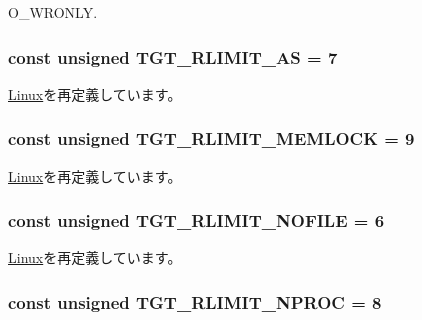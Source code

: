 O\_\-WRONLY. \hypertarget{classAlphaLinux_a6e372e5f43e2da816e9bbf5088d89c21}{
\subsubsection[{TGT\_\-RLIMIT\_\-AS}]{\setlength{\rightskip}{0pt plus 5cm}const unsigned {\bf TGT\_\-RLIMIT\_\-AS} = 7}}
\label{classAlphaLinux_a6e372e5f43e2da816e9bbf5088d89c21}


\hyperlink{classLinux_a6e372e5f43e2da816e9bbf5088d89c21}{Linux}を再定義しています。\hypertarget{classAlphaLinux_acfa2b204cbb5bca2fbc2c1f15649aca2}{
\subsubsection[{TGT\_\-RLIMIT\_\-MEMLOCK}]{\setlength{\rightskip}{0pt plus 5cm}const unsigned {\bf TGT\_\-RLIMIT\_\-MEMLOCK} = 9}}
\label{classAlphaLinux_acfa2b204cbb5bca2fbc2c1f15649aca2}


\hyperlink{classLinux_acfa2b204cbb5bca2fbc2c1f15649aca2}{Linux}を再定義しています。\hypertarget{classAlphaLinux_a7eca1a56bf2a00dce74320c95a0b176e}{
\subsubsection[{TGT\_\-RLIMIT\_\-NOFILE}]{\setlength{\rightskip}{0pt plus 5cm}const unsigned {\bf TGT\_\-RLIMIT\_\-NOFILE} = 6}}
\label{classAlphaLinux_a7eca1a56bf2a00dce74320c95a0b176e}


\hyperlink{classLinux_a7eca1a56bf2a00dce74320c95a0b176e}{Linux}を再定義しています。\hypertarget{classAlphaLinux_af16b609dcc51ebef365e8258e28d777c}{
\subsubsection[{TGT\_\-RLIMIT\_\-NPROC}]{\setlength{\rightskip}{0pt plus 5cm}const unsigned {\bf TGT\_\-RLIMIT\_\-NPROC} = 8}}
\label{classAlphaLinux_af16b609dcc51ebef365e8258e28d777c}


